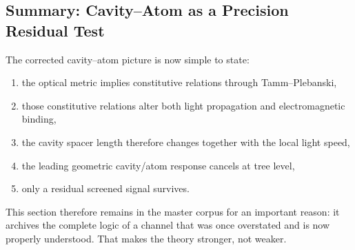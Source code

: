 \subsection{Summary: Cavity--Atom as a Precision Residual Test}\label{sec:cavity-summary}

The corrected cavity--atom picture is now simple to state:
\begin{enumerate}
\item the optical metric implies constitutive relations through Tamm--Plebanski,
\item those constitutive relations alter both light propagation and electromagnetic binding,
\item the cavity spacer length therefore changes together with the local light speed,
\item the leading geometric cavity/atom response cancels at tree level,
\item only a residual screened signal survives.
\end{enumerate}

This section therefore remains in the master corpus for an important reason: it archives the complete logic of a channel that was once overstated and is now properly understood.  That makes the theory stronger, not weaker.
